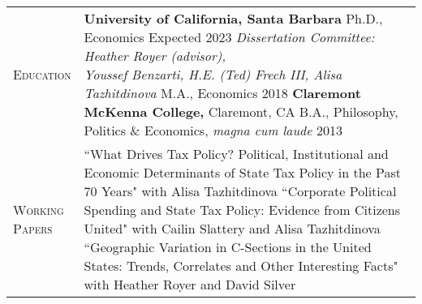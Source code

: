 \documentclass[11pt]{article}
\begin{document}
\begin{tabularx}{\textwidth}{@{}Y Z@{}}
	
	\textsc{Education} \vspace{20pt} &
	\textbf{University of California, Santa Barbara}
	\vspace{3pt} \newline
	\hspace*{15pt} Ph.D., Economics \hfill Expected 2023
	\vspace{3pt} \newline
	\hspace*{15pt} \textit{Dissertation Committee: Heather Royer (advisor), \newline \hspace*{15pt} Youssef Benzarti, H.E. (Ted) Frech III, Alisa Tazhitdinova} 
	\vspace{10pt} \newline
	\hspace*{15pt} M.A., Economics \hfill 2018
	\vspace{15pt} \newline
	\textbf{Claremont McKenna College,} Claremont, CA 
	\vspace{3pt} \newline
	\hspace*{15pt} B.A., Philosophy, Politics \& Economics, \textit{magna cum laude} \hfill 2013
	\vspace{0pt}
	\\[20pt]


	\textsc{Working \newline Papers} \vspace{20pt} & 
	``What Drives Tax Policy? Political, Institutional and Economic Determinants \newline of State Tax Policy in the Past 70 Years" with Alisa Tazhitdinova \href{https://papers.ssrn.com/sol3/papers.cfm?abstract_id=4035979}{}
	\vspace{15pt} \newline
	``Corporate Political Spending and State Tax Policy: Evidence from Citizens United" \newline with Cailin Slattery and Alisa Tazhitdinova
	\vspace{15pt} \newline
	``Geographic Variation in C-Sections in the United States: Trends, Correlates \newline and Other Interesting Facts" with Heather Royer and David Silver \href{https://irle.berkeley.edu/files/2022/05/rrs_csection_version_davefest.pdf}{}
    \\[20pt]
    

\end{tabularx}
\end{document}
